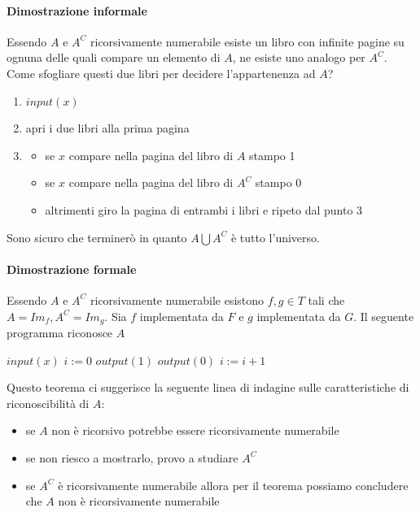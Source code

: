 \documentclass{article}
\begin{document}
\paragraph{Dimostrazione informale}
Essendo $A$ e $A^C$ ricorsivamente numerabile esiste un libro con infinite pagine su ognuna delle quali compare un elemento di $A$, ne esiste uno analogo per $A^C$. Come sfogliare questi due libri per decidere l'appartenenza ad $A$?
\begin{enumerate}
	\item $input(x)$
	\item apri i due libri alla prima pagina
	\item 
		\begin{itemize}
			\item se $x$ compare nella pagina del libro di $A$ stampo 1
			\item se $x$ compare nella pagina del libro di $A^C$ stampo 0
			\item altrimenti giro la pagina di entrambi i libri e ripeto dal punto 3
\end{itemize}		 
\end{enumerate}
Sono sicuro che terminerò in quanto $A \bigcup A^C$ è tutto l'universo.
\paragraph{Dimostrazione formale}
Essendo $A$ e $A^C$ ricorsivamente numerabile esistono $f, g \in T$ tali che $A=Im_f, A^C=Im_g$. Sia $f$ implementata da $F$ e $g$ implementata da $G$. Il seguente programma riconosce $A$
\begin{algorithm}[h]
        \begin{algorithmic}[1]
			\State $input(x)$
			\State $i:=0$
        			\State $output(1)$
        		\EndIf
        			\State $output(0)$
        		\EndIf
        		\State $i:=i+1$
        		\EndWhile
        		  
        \end{algorithmic}
    \end{algorithm}

Questo teorema ci suggerisce la seguente linea di indagine sulle caratteristiche di riconoscibilità di $A$:
\begin{itemize}
	\item se $A$ non è ricorsivo potrebbe essere ricorsivamente numerabile
	\item se non riesco a mostrarlo, provo a studiare $A^C$
	\item se $A^C$ è ricorsivamente numerabile allora per il teorema possiamo concludere che $A$ non è ricorsivamente numerabile
\end{itemize}
\end{document}
